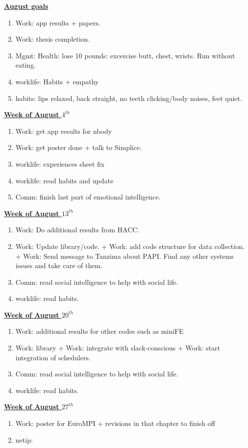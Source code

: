 \underline{\textbf{August goals}}\\
\begin{enumerate}
\item Work: app results + papers. 
\item Work: thesis completion. 
\item Mgmt: Health: lose 10 pounds:  excercise butt, chest, wrists. Run without eating.
\item worklife: Habits + empathy
\item habits: lips relaxed, back straight, no teeth clicking/body noises, feet quiet. 
\end{enumerate}

\underline{\textbf{Week of August $4^{th}$}} \\

\begin{enumerate}
\item Work: get app results for nbody 
\item Work: get poster done + talk to Simplice. 
\item worklife: experiences sheet fix 
\item worklife: read habits and update 
\item Comm: finish last part of emotional intelligence. 
\end{enumerate}

\underline{\textbf{Week of August $13^{th}$}} \\
\begin{enumerate} 
\item Work: Do additional results from HACC. 
\item Work: Update library/code.  +  Work: add code structure for data collection. +  Work: Send message to Tanzima about PAPI. Find any other systems issues and take care of them. 

\item Comm: read social intelligence to help with social life. 
\item worklife: read habits. 
\end{enumerate}

\underline{\textbf{Week of August $20^{th}$}} \\
\begin{enumerate} 

\item Work: additional results for other codes such as miniFE
\item Work: library +  Work: integrate with slack-conscious +  Work: start integration of schedulers. 

\item Comm: read social intelligence to help with social life. 
\item worklife: read habits. 

\end{enumerate}

\underline{\textbf{Week of August $27^{th}$}} \\
\begin{enumerate}

 \item Work: poster for EuroMPI + revisions in that chapter  to finish off
 \item netip: 
\end{enumerate}
